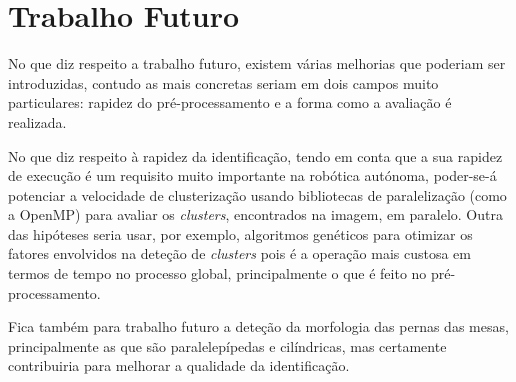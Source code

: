 \section{Trabalho Futuro}

No que diz respeito a trabalho futuro, existem várias melhorias que poderiam ser introduzidas, contudo as mais concretas seriam em dois campos muito particulares: rapidez do pré-processamento e a forma como a avaliação é realizada.

No que diz respeito à rapidez da identificação, tendo em conta que a sua rapidez de execução é um requisito muito importante na robótica autónoma, poder-se-á potenciar a velocidade de clusterização usando bibliotecas de paralelização (como a OpenMP) para avaliar os \emph{clusters}, encontrados na imagem, em paralelo. Outra das hipóteses seria usar, por exemplo, algoritmos genéticos para otimizar os fatores envolvidos na deteção de \emph{clusters} pois é a operação mais custosa em termos de tempo no processo global, principalmente o que é feito no pré-processamento.

Fica também para trabalho futuro a deteção da morfologia das pernas das mesas, principalmente as que são paralelepípedas e cilíndricas, mas certamente contribuiria para melhorar a qualidade da identificação.





